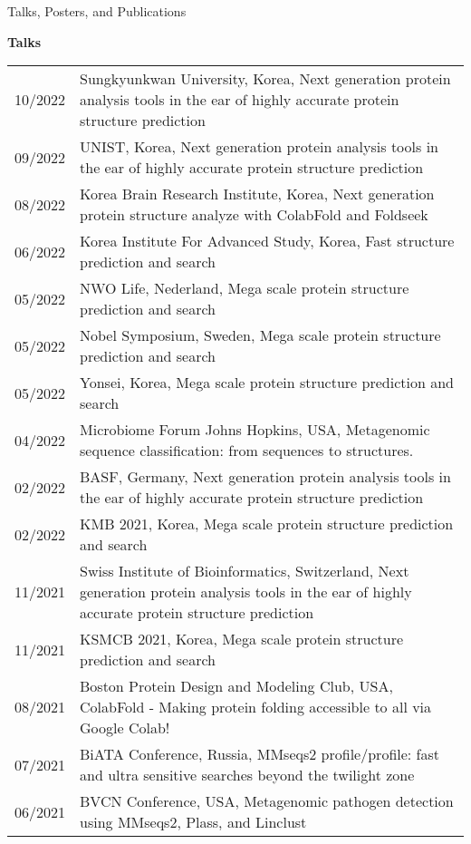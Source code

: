 \documentclass{resume} %
\begin{document}
\begin{rSection}{Talks, Posters, and Publications}
\vspace{2mm}

{\bf Talks }\vspace{1mm}

\begin{tabular}{p{2.5cm}p{14.1cm}}
10/2022 & Sungkyunkwan University, Korea, Next generation protein analysis tools in the ear of highly accurate protein structure prediction 
\\[1.mm] 
09/2022 & UNIST, Korea, Next generation protein analysis tools in the ear of highly accurate protein structure prediction 
\\[1.mm] 
08/2022 & Korea Brain Research Institute, Korea, Next generation protein structure analyze with ColabFold and Foldseek 
\\[1.mm] 
06/2022 & Korea Institute For Advanced Study, Korea, Fast structure prediction and search
\\[1.mm] 
05/2022 & NWO Life, Nederland, Mega scale protein structure prediction and search
\\[1.mm] 
05/2022 & Nobel Symposium, Sweden, Mega scale protein structure prediction and search
\\[1.mm] 
05/2022 & Yonsei, Korea, Mega scale protein structure prediction and search
\\[1.mm] 
04/2022 & Microbiome Forum Johns Hopkins, USA, Metagenomic sequence classification: from sequences to structures. 
\\[1.mm] 
02/2022 & BASF, Germany, Next generation protein analysis tools in the ear of highly accurate protein structure prediction
\\[1.mm] 
02/2022 & KMB 2021, Korea, Mega scale protein structure prediction and search
\\[1.mm] 
11/2021 & Swiss Institute of Bioinformatics, Switzerland, Next generation protein analysis tools in the ear of highly accurate protein structure prediction
\\[1.mm] 
11/2021 & KSMCB 2021, Korea, Mega scale protein structure prediction and search
\\[1.mm] 
08/2021 & Boston Protein Design and Modeling Club, USA, ColabFold - Making protein folding accessible to all via Google Colab!
\\[1.mm] 
07/2021 & BiATA Conference, Russia, MMseqs2 profile/profile: fast and ultra sensitive searches beyond the twilight zone
\\[1.mm] 
06/2021 & BVCN Conference, USA, Metagenomic pathogen detection using MMseqs2, Plass, and Linclust

\end{tabular}
\end{rSection}
\end{document}
